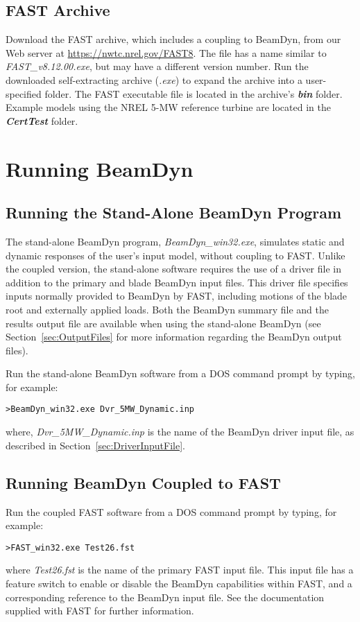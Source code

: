 \subsection{FAST Archive}
Download the FAST archive, which includes a coupling to BeamDyn, from our Web server at \url{https://nwtc.nrel.gov/FAST8}. The file has a name similar to \textit{FAST\_v8.12.00.exe}, but may have a different version number. Run the downloaded self-extracting archive ({\it .exe}) to expand the archive into a user-specified folder. The FAST executable file is located in the archive's \textbf{{\it bin}} folder. Example models using the NREL 5-MW reference turbine are located in the \textbf{{\it CertTest}} folder.

\section{Running BeamDyn}
\subsection{Running the Stand-Alone BeamDyn Program}
The stand-alone BeamDyn program, {\it BeamDyn\_win32.exe}, simulates static and dynamic responses of the user's input model, without coupling to FAST. Unlike the coupled version, the stand-alone software requires the use of a driver file in addition to the primary  and blade BeamDyn input files. This driver file specifies inputs normally provided to BeamDyn by FAST, including motions of the blade root and externally applied loads. Both the BeamDyn summary file and the results output file are available when using the stand-alone BeamDyn (see Section~\ref{sec:OutputFiles} for more information regarding the BeamDyn output files).

Run the stand-alone BeamDyn software from a DOS command prompt by typing, for example:
\begin{verbatim}
>BeamDyn_win32.exe Dvr_5MW_Dynamic.inp
\end{verbatim}
where, {\it Dvr\_5MW\_Dynamic.inp} is the name of the BeamDyn driver input file, as described in Section~\ref{sec:DriverInputFile}.

\subsection{Running BeamDyn Coupled to FAST}
Run the coupled FAST software from a DOS command prompt by typing, for example:
\begin{verbatim}
>FAST_win32.exe Test26.fst
\end{verbatim}
where {\it Test26.fst} is the name of the primary FAST input file. This input file has a feature switch to enable or disable the BeamDyn capabilities within FAST, and a corresponding reference to the BeamDyn input file. See the documentation supplied with FAST for further information.





